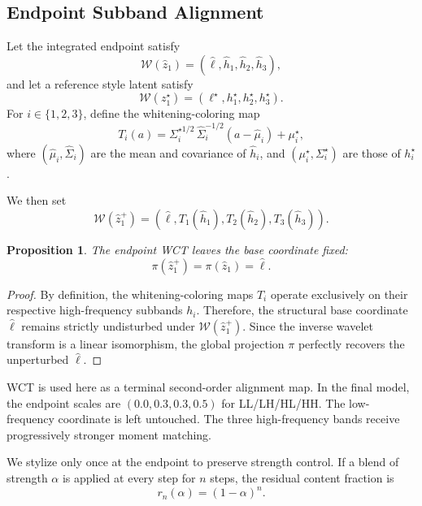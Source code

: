 \documentclass[letterpaper]{article}
\newtheorem{proposition}{Proposition}
\begin{document}
\subsection{Endpoint Subband Alignment}
\label{sec:eota}

Let the integrated endpoint satisfy
\begin{equation}
\mathcal W(\hat z_1) = (\hat \ell,\hat h_1,\hat h_2,\hat h_3),
\end{equation}
and let a reference style latent satisfy
\begin{equation}
\mathcal W(z_1^\star) = (\ell^\star,h_1^\star,h_2^\star,h_3^\star).
\end{equation}
For $i\in\{1,2,3\}$, define the whitening-coloring map
\begin{equation}
T_i(a) = \Sigma_i^{\star 1/2}\,\hat\Sigma_i^{-1/2}(a-\hat\mu_i)+\mu_i^\star,
\end{equation}
where $(\hat\mu_i,\hat\Sigma_i)$ are the mean and covariance of $\hat h_i$, and $(\mu_i^\star,\Sigma_i^\star)$ are those of $h_i^\star$.

We then set
\begin{equation}
\mathcal W(\hat z_1^+) = (\hat \ell, T_1(\hat h_1), T_2(\hat h_2), T_3(\hat h_3)).
\end{equation}

\begin{proposition}
\label{prop:wct}
The endpoint WCT leaves the base coordinate fixed:
\begin{equation}
\pi(\hat z_1^+) = \pi(\hat z_1) = \hat \ell.
\end{equation}
\end{proposition}
\begin{proof}
By definition, the whitening-coloring maps $T_i$ operate exclusively on their respective high-frequency subbands $h_i$. Therefore, the structural base coordinate $\hat \ell$ remains strictly undisturbed under $\mathcal W(\hat z_1^+)$. Since the inverse wavelet transform is a linear isomorphism, the global projection $\pi$ perfectly recovers the unperturbed $\hat\ell$.
\end{proof}

WCT is used here as a terminal second-order alignment map.
In the final model, the endpoint scales are $(0.0, 0.3, 0.3, 0.5)$ for LL/LH/HL/HH.
The low-frequency coordinate is left untouched.
The three high-frequency bands receive progressively stronger moment matching.

We stylize only once at the endpoint to preserve strength control.
If a blend of strength $\alpha$ is applied at every step for $n$ steps, the residual content fraction is
\begin{equation}
r_n(\alpha) = (1-\alpha)^n.
\end{equation}
\end{document}
